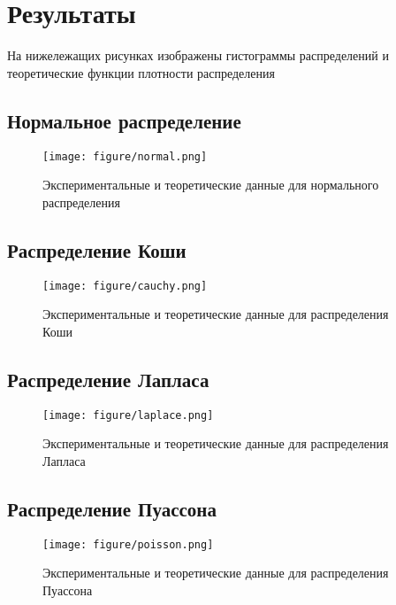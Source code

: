 \section{Результаты}
На нижележащих рисунках изображены гистограммы распределений и теоретические функции плотности распределения

\subsection{Нормальное распределение}
\begin{figure}
	\begin{center}
		\texttt{[image: figure/normal.png]}
		\caption{Экспериментальные и теоретические данные для нормального распределения} 
		\label{pic:pic_name}
	\end{center}
\end{figure}

\subsection{Распределение Коши}
\begin{figure}
	\begin{center}
		\texttt{[image: figure/cauchy.png]}
		\caption{Экспериментальные и теоретические данные для распределения Коши} 
		\label{pic:pic_name} %
	\end{center}
\end{figure}

\subsection{Распределение Лапласа}
\begin{figure}
	\begin{center}
		\texttt{[image: figure/laplace.png]}
		\caption{Экспериментальные и теоретические данные для распределения Лапласа} 
		\label{pic:pic_name} %
	\end{center}
\end{figure}

\subsection{Распределение Пуассона}
\begin{figure}
	\begin{center}
		\texttt{[image: figure/poisson.png]}
		\caption{Экспериментальные и теоретические данные для распределения Пуассона} 
		\label{pic:pic_name} %
	\end{center}
\end{figure}

